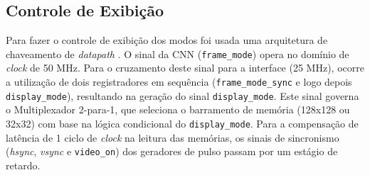 \subsection{Controle de Exibição}
Para fazer o controle de exibição dos modos foi usada uma arquitetura de chaveamento de \textit{datapath} . O sinal da CNN (\texttt{frame\_mode}) opera no domínio de \textit{clock} de 50 MHz. Para o cruzamento deste sinal para a interface (25 MHz), ocorre a utilização de dois registradores em sequência (\texttt{frame\_mode\_sync} e logo depois \texttt{display\_mode}), resultando na geração do sinal \texttt{display\_mode}. Este sinal governa o Multiplexador 2-para-1, que seleciona o barramento de memória (128x128 ou 32x32) com base na lógica condicional do \texttt{display\_mode}. Para a compensação de latência de 1 ciclo de \textit{clock} na leitura das memórias, os sinais de sincronismo (\textit{hsync}, \textit{vsync}  e \texttt{video\_on}) dos geradores de pulso passam por um estágio de retardo.